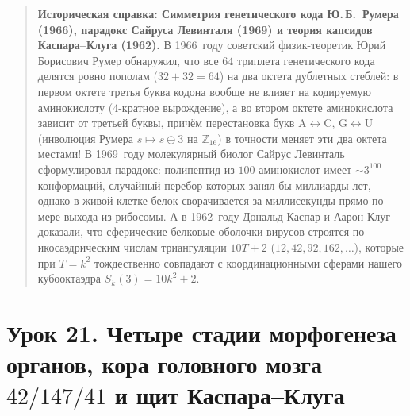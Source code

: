 \begin{quote}
\small\textbf{Историческая справка: Симметрия генетического кода Ю.\,Б.~Румера (1966), парадокс Сайруса Левинталя (1969) и теория капсидов Каспара--Клуга (1962).}
В 1966~году советский физик-теоретик Юрий Борисович Румер обнаружил, что все $64$ триплета генетического кода делятся ровно пополам ($32 + 32 = 64$) на два октета дублетных стеблей: в первом октете третья буква кодона вообще не влияет на кодируемую аминокислоту (4-кратное вырождение), а во втором октете аминокислота зависит от третьей буквы, причём перестановка букв $\mathrm{A}\leftrightarrow\mathrm{C}$, $\mathrm{G}\leftrightarrow\mathrm{U}$ (инволюция Румера $s \mapsto s \oplus 3$ на $\mathbb{Z}_{16}$) в точности меняет эти два октета местами! В 1969~году молекулярный биолог Сайрус Левинталь сформулировал парадокс: полипептид из $100$ аминокислот имеет $\sim 3^{100}$ конформаций, случайный перебор которых занял бы миллиарды лет, однако в живой клетке белок сворачивается за миллисекунды прямо по мере выхода из рибосомы. А в 1962~году Дональд Каспар и Аарон Клуг доказали, что сферические белковые оболочки вирусов строятся по икосаэдрическим числам триангуляции $10T + 2$ ($12, 42, 92, 162, \dots$), которые при $T = k^2$ тождественно совпадают с координационными сферами нашего кубооктаэдра $S_k(3) = 10k^2 + 2$.
\end{quote}

\section{Урок 21. Четыре стадии морфогенеза органов, кора головного мозга \texorpdfstring{$42 / 147 / 41$}{42 / 147 / 41} и щит Каспара--Клуга}

